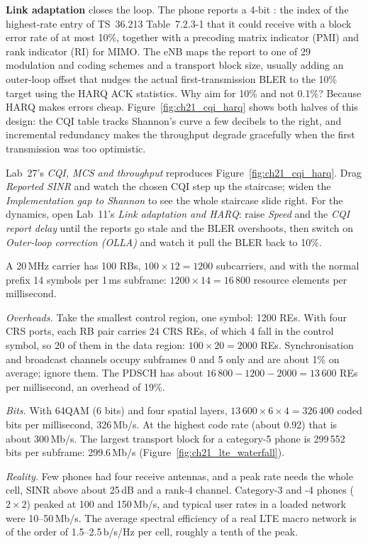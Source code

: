 \textbf{Link adaptation} closes the loop. The phone reports a 4-bit
: the index of the highest-rate entry of TS~36.213 Table~7.2.3-1 that it could receive with
a block error rate of at most 10\%, together with a precoding matrix indicator (PMI) and rank
indicator (RI) for MIMO. The eNB maps the report to one of 29 modulation and coding schemes and a
transport block size, usually adding an outer-loop offset that nudges the actual first-transmission
BLER to the 10\% target using the HARQ ACK statistics. Why aim for 10\% and not 0.1\%? Because HARQ
makes errors cheap. Figure~\ref{fig:ch21_cqi_harq} shows both halves of this design: the CQI table
tracks Shannon's curve a few decibels to the right, and incremental redundancy makes the throughput
degrade gracefully when the first transmission was too optimistic.

\begin{tryit}
Lab~27's \emph{CQI, MCS and throughput} reproduces Figure~\ref{fig:ch21_cqi_harq}. Drag
\emph{Reported SINR} and watch the chosen CQI step up the staircase; widen the \emph{Implementation
gap to Shannon} to see the whole staircase slide right. For the dynamics, open Lab~11's \emph{Link
adaptation and HARQ}: raise \emph{Speed} and the \emph{CQI report delay} until the reports go stale
and the BLER overshoots, then switch on \emph{Outer-loop correction (OLLA)} and watch it pull the
BLER back to 10\%.
\end{tryit}

\begin{worked}
A 20\,MHz carrier has 100 RBs, $100\times12=1200$ subcarriers, and with the normal prefix 14 symbols
per 1\,ms subframe: $1200\times14=16\,800$ resource elements per millisecond.

\emph{Overheads.} Take the smallest control region, one symbol: 1200 REs. With four CRS ports, each
RB pair carries 24 CRS REs, of which 4 fall in the control symbol, so 20 of them in the data region:
$100\times20=2000$ REs. Synchronisation and broadcast channels occupy subframes 0 and 5 only and are
about 1\% on average; ignore them. The PDSCH has about $16\,800-1200-2000=13\,600$ REs per
millisecond, an overhead of 19\%.

\emph{Bits.} With 64QAM (6 bits) and four spatial layers, $13\,600\times6\times4=326\,400$ coded bits
per millisecond, 326\,Mb/s. At the highest code rate (about 0.92) that is about 300\,Mb/s. The
largest transport block for a category-5 phone is 299\,552 bits per subframe: 299.6\,Mb/s
(Figure~\ref{fig:ch21_lte_waterfall}).

\emph{Reality.} Few phones had four receive antennas, and a peak rate needs the whole cell, SINR above
about 25\,dB and a rank-4 channel. Category-3 and -4 phones ($2\times2$) peaked at 100 and 150\,Mb/s,
and typical user rates in a loaded network were 10--50\,Mb/s. The average spectral efficiency of a
real LTE macro network is of the order of 1.5--2.5\,b/s/Hz per cell, roughly a tenth of the peak.
\end{worked}

